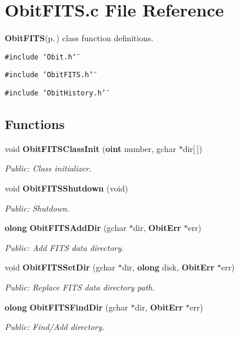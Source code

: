 \section{Obit\-FITS.c File Reference}
\label{ObitFITS_8c}
{\bf Obit\-FITS}{\rm (p.\,\pageref{structObitFITS})} class function definitions. 

{\tt \#include \char`\"{}Obit.h\char`\"{}}\par
{\tt \#include \char`\"{}Obit\-FITS.h\char`\"{}}\par
{\tt \#include \char`\"{}Obit\-History.h\char`\"{}}\par
\subsection*{Functions}
\begin{CompactItemize}
\item 
void {\bf Obit\-FITSClass\-Init} ({\bf oint} number, gchar $\ast$dir[$\,$])
\begin{CompactList}\small\item\em Public: Class initializer. \item\end{CompactList}\item 
void {\bf Obit\-FITSShutdown} (void)
\begin{CompactList}\small\item\em Public: Shutdown. \item\end{CompactList}\item 
{\bf olong} {\bf Obit\-FITSAdd\-Dir} (gchar $\ast$dir, {\bf Obit\-Err} $\ast$err)
\begin{CompactList}\small\item\em Public: Add FITS data directory. \item\end{CompactList}\item 
void {\bf Obit\-FITSSet\-Dir} (gchar $\ast$dir, {\bf olong} disk, {\bf Obit\-Err} $\ast$err)
\begin{CompactList}\small\item\em Public: Replace FITS data directory path. \item\end{CompactList}\item 
{\bf olong} {\bf Obit\-FITSFind\-Dir} (gchar $\ast$dir, {\bf Obit\-Err} $\ast$err)
\begin{CompactList}\small\item\em Public: Find/Add directory. \item\end{CompactList}\item 

\end{CompactItemize}
